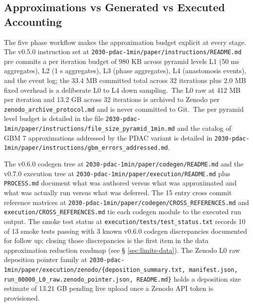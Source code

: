 
\subsection{Approximations vs Generated vs Executed Accounting}
\label{sec:limits-accounting}

The five phase workflow makes the approximation budget explicit
at every stage. The v0.5.0 instruction set at
\texttt{2030-pdac-1min/paper/instructions/README.md} pre commits a
per iteration budget of 980 KB across pyramid levels L1 (50 ms
aggregates), L2 (1 s aggregates), L3 (phase aggregates), L4
(anastomosis events), and the event log; the 33.4 MB committed
total across 32 iterations plus 2.0 MB fixed overhead is a
deliberate L0 to L4 down sampling.\ The L0 raw at 412 MB per
iteration and 13.2 GB across 32 iterations is archived to Zenodo
per \texttt{zenodo_archive_protocol.md} and is never committed to
Git.\ The per pyramid level budget is detailed in the file
\texttt{2030-pdac-1min/paper/instructions/file_size_pyramid_1min.md}
and the catalog of GBM 7 approximations addressed by the PDAC
variant is detailed in
\texttt{2030-pdac-1min/paper/instructions/gbm_errors_addressed.md}.

The v0.6.0 codegen tree at
\texttt{2030-pdac-1min/paper/codegen/README.md} and the v0.7.0
execution tree at
\texttt{2030-pdac-1min/paper/execution/README.md} plus
\texttt{PROCESS.md} document what was authored versus what was
approximated and what was actually run versus what was deferred.
The 15 entry cross commit reference matrices at
\texttt{2030-pdac-1min/paper/codegen/CROSS_REFERENCES.md} and
\texttt{execution/CROSS_REFERENCES.md} tie each codegen module to
the executed run output. The smoke test status at
\texttt{execution/tests/test_status.txt} records 10 of 13 smoke
tests passing with 3 known v0.6.0 codegen discrepancies documented
for follow up; closing those discrepancies is the first item in
the data approximation reduction roadmap (see \S
\ref{sec:limits-data}). The Zenodo L0 raw deposition pointer
family at
\texttt{2030-pdac-1min/paper/execution/zenodo/\{deposition_summary.txt, manifest.json, run_00000_L0_raw.zenodo_pointer.json, README.md\}}
holds a deposition size estimate of 13.21 GB pending live upload
once a Zenodo API token is provisioned.

